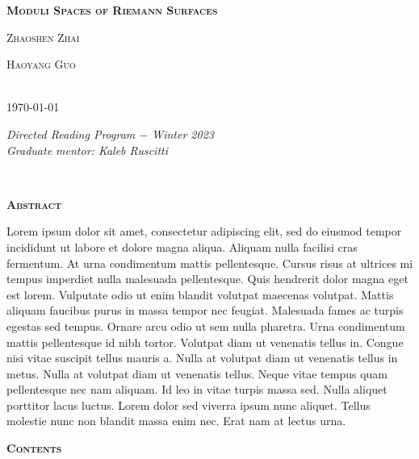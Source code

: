 \pagestyle{empty}
\begin{center}
    \Large\textbf{\textsc{Moduli Spaces of Riemann Surfaces}}
    \\[1.2\baselineskip]
    \begin{minipage}{0.2\textwidth}
        \begin{center}
            \large{\textsc{Zhaoshen Zhai}}
        \end{center}
    \end{minipage}
    \begin{minipage}{0.2\textwidth}
        \begin{center}
            \large{\textsc{Haoyang Guo}}
        \end{center}
    \end{minipage}
    \\[\baselineskip]
    \normalsize\today
\end{center}
\vspace*{0.01\textheight}
\begin{minipage}{0.5\textwidth}
    \hspace{0.2in}\textit{Directed Reading Program $-$ Winter 2023}
    \\[0.3\baselineskip]
    \hspace*{0.19in}\textit{Graduate mentor: Kaleb Ruscitti}
\end{minipage}
\\[\baselineskip]
\begin{center}
    \textsc{\bfseries Abstract}
    \\[1.5\baselineskip]
    \begin{minipage}{0.8\textwidth}
        Lorem ipsum dolor sit amet, consectetur adipiscing elit, sed do eiusmod tempor incididunt ut labore et dolore magna aliqua. Aliquam nulla facilisi cras fermentum. At urna condimentum mattis pellentesque. Cursus risus at ultrices mi tempus imperdiet nulla malesuada pellentesque. Quis hendrerit dolor magna eget est lorem. Vulputate odio ut enim blandit volutpat maecenas volutpat. Mattis aliquam faucibus purus in massa tempor nec feugiat. Malesuada fames ac turpis egestas sed tempus. Ornare arcu odio ut sem nulla pharetra. Urna condimentum mattis pellentesque id nibh tortor. Volutpat diam ut venenatis tellus in. Congue nisi vitae suscipit tellus mauris a. Nulla at volutpat diam ut venenatis tellus in metus. Nulla at volutpat diam ut venenatis tellus. Neque vitae tempus quam pellentesque nec nam aliquam. Id leo in vitae turpis massa sed. Nulla aliquet porttitor lacus luctus. Lorem dolor sed viverra ipsum nunc aliquet. Tellus molestie nunc non blandit massa enim nec. Erat nam at lectus urna.
    \end{minipage}
\end{center}
\vspace*{0.02\textheight}
\begin{center}
    \textsc{\bfseries Contents}
\end{center}

\toccontents
\clearpage
\pagestyle{fancyplain}
\fancyhead[L,C,R]{}
\fancyfoot[L,R]{}
\fancyfoot[C]{\thepage}
\renewcommand{\headrulewidth}{0pt}
\setcounter{page}{1}
